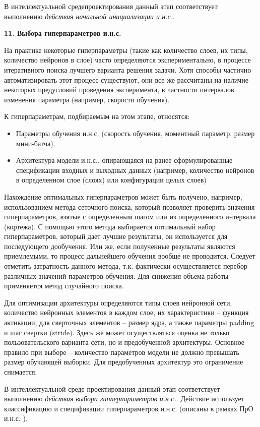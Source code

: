 В интеллектуальной средепроектирования данный этап соответствует выполнению \textit{действия начальной инициализации и.н.с.}.

\textbf{11. Выбора гиперпараметров и.н.с.}

На практике некоторые гиперпараметры (такие как количество слоев, их типы, количество нейронов в слое) часто определяются экспериментально, в процессе итеративного поиска лучшего варианта решения задачи. Хотя способы частично автоматизировать этот процесс существуют, они все же рассчитаны на наличие некоторых предусловий проведения эксперимента, в частности интервалов изменения параметра (например, скорости обучения).

К гиперпараметрам, подбираемым на этом этапе, относятся:
\begin{itemize}
	\item Параметры обучения и.н.с. (скорость обучения, моментный параметр, размер мини-батча).
	\item Архитектура модели и.н.с., опирающаяся на ранее сформулированные спецификации входных и выходных данных (например, количество нейронов в определенном слое (слоях) или конфигурации целых слоев)
\end{itemize}

Нахождение оптимальных гиперпараметров может быть получено, например, использованием метода сеточного поиска, который позволяет проверить значения гиперпараметров, взятые с определенным шагом или из определенного интервала (кортежа). С помощью этого метода выбирается оптимальный набор гиперпараметров, который дает лучшие результаты, он используется для последующего дообучения. Или же, если полученные результаты являются приемлемыми, то процесс дальнейшего обучения вообще не проводится. Следует отметить затратность данного метода, т.к. фактически осуществляется перебор различных значений параметров обучения. Для снижения объема работы применяется метод случайного поиска.

Для оптимизации архитектуры определяются типы слоев нейронной сети, количество нейронных элементов в каждом слое, их характеристики -- функция активации, для сверточных элементов -- размер ядра, а также  параметры padding и шаг свертки (stride).
Здесь же может осуществляться оценка не только пользовательского варианта сети, но и предобученной архитектуры. Основное правило при выборе -- количество параметров модели не должно превышать размер обучающей выборки. Для предобученных архитектур это ограничение снимается.

В интеллектуальной среде проектирования данный этап соответствует выполнению \textit{действия выбора гипперпараметров и.н.с.}. Действие использует классификацию и спецификации гиперпараметров и.н.с. (описаны в рамках ПрО и.н.с. \cite{Kovalev2022}). 

